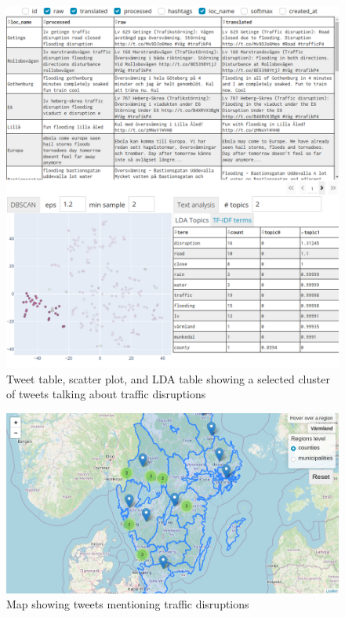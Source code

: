 \begin{figure}[H]
  \begin{center}
    \includegraphics[width=\columnwidth]{./images/4days_text_analysis_traffic_disruption.png}
  \end{center}
  \caption{Tweet table, scatter plot, and \ac{LDA} table showing a selected cluster of tweets
  talking about traffic disruptions}
  \label{fig:4days_text_analysis_traffic_disruption}
\end{figure}

\begin{figure}[H]
  \begin{center}
    \includegraphics[width=\columnwidth]{./images/4days_text_analysis_traffic_disruption_map.png}
  \end{center}
  \caption{Map showing tweets mentioning traffic disruptions}
  \label{fig:4days_text_analysis_traffic_disruption_map}
\end{figure}
